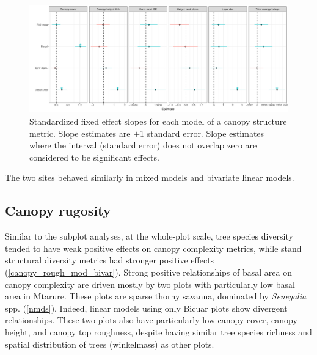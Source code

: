 \documentclass[11pt,a4paper]{article}
\begin{document}
\begin{figure}[H]
\centering
	\includegraphics[width=\textwidth]{height_profile_mod_rich_slopes}
	\caption{Standardized fixed effect slopes for each model of a canopy structure metric. Slope estimates are $\pm$1 standard error. Slope estimates where the interval (standard error) does not overlap zero are considered to be significant effects.}
	\label{height_profile_mod_rich_slopes}
\end{figure}

The two sites behaved similarly in mixed models and bivariate linear models.

\subsection{Canopy rugosity}

Similar to the subplot analyses, at the whole-plot scale, tree species diversity tended to have weak positive effects on canopy complexity metrics, while stand structural diversity metrics had stronger positive effects (\autoref{canopy_rough_mod_bivar}). Strong positive relationships of basal area on canopy complexity are driven mostly by two plots with particularly low basal area in Mtarure. These plots are sparse thorny savanna, dominated by \textit{Senegalia} spp. (\autoref{nmds}). Indeed, linear models using only Bicuar plots show divergent relationships. These two plots also have particularly low canopy cover, canopy height, and canopy top roughness, despite having similar tree species richness and spatial distribution of trees (winkelmass) as other plots.
\end{document}
